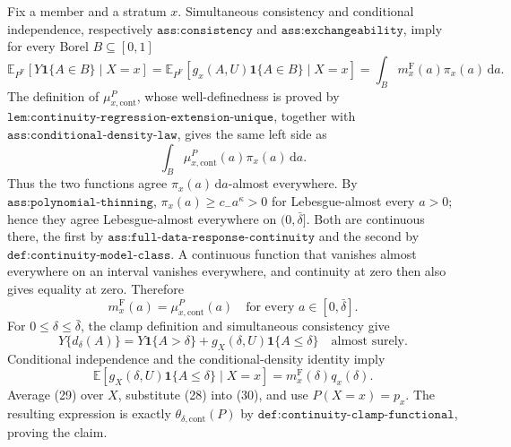 Fix a member and a stratum \(x\).  Simultaneous consistency and conditional independence, respectively \(\texttt{ass:consistency}\) and \(\texttt{ass:exchangeability}\), imply for every Borel \(B\subseteq[0,1]\)
\[
 \mathbb E_{P^{\mathrm F}}[Y\mathbf 1\{A\in B\}\mid X=x]
 =\mathbb E_{P^{\mathrm F}}[g_x(A,U)\mathbf 1\{A\in B\}\mid X=x]
 =\int_Bm_x^{\mathrm F}(a)\pi_x(a)\,\mathrm da. \tag{26}
\]
The definition of \(\mu_{x,\mathrm{cont}}^P\), whose well-definedness is proved by \(\texttt{lem:continuity-regression-extension-unique}\), together with \(\texttt{ass:conditional-density-law}\), gives the same left side as
\[
 \int_B\mu_{x,\mathrm{cont}}^P(a)\pi_x(a)\,\mathrm da. \tag{27}
\]
Thus the two functions agree \(\pi_x(a)\,\mathrm da\)-almost everywhere.  By \(\texttt{ass:polynomial-thinning}\), \(\pi_x(a)\geq c_-a^\kappa>0\) for Lebesgue-almost every \(a>0\); hence they agree Lebesgue-almost everywhere on \((0,\bar\delta]\).  Both are continuous there, the first by \(\texttt{ass:full-data-response-continuity}\) and the second by \(\texttt{def:continuity-model-class}\).  A continuous function that vanishes almost everywhere on an interval vanishes everywhere, and continuity at zero then also gives equality at zero.  Therefore
\[
 m_x^{\mathrm F}(a)=\mu_{x,\mathrm{cont}}^P(a)
 \quad\text{for every }a\in[0,\bar\delta]. \tag{28}
\]
For \(0\leq\delta\leq\bar\delta\), the clamp definition and simultaneous consistency give
\[
 Y\{d_\delta(A)\}
 =Y\mathbf 1\{A>\delta\}+g_X(\delta,U)\mathbf 1\{A\leq\delta\}
 \quad\text{almost surely}. \tag{29}
\]
Conditional independence and the conditional-density identity imply
\[
 \mathbb E[g_X(\delta,U)\mathbf 1\{A\leq\delta\}\mid X=x]
 =m_x^{\mathrm F}(\delta)q_x(\delta). \tag{30}
\]
Average (29) over \(X\), substitute (28) into (30), and use \(P(X=x)=p_x\).  The resulting expression is exactly \(\theta_{\delta,\mathrm{cont}}(P)\) by \(\texttt{def:continuity-clamp-functional}\), proving the claim.